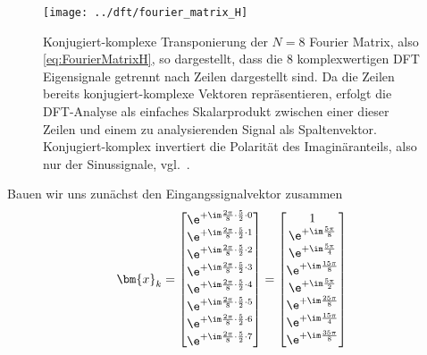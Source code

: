 \begin{figure}
\centering
\texttt{[image: ../dft/fourier\_matrix\_H]}
\caption{Konjugiert-komplexe Transponierung der $N=8$ Fourier Matrix,
also \eqref{eq:FourierMatrixH}, so dargestellt, dass
die 8 komplexwertigen DFT Eigensignale getrennt nach Zeilen dargestellt sind.
Da die Zeilen bereits konjugiert-komplexe Vektoren repräsentieren, erfolgt die
DFT-Analyse als einfaches Skalarprodukt zwischen einer dieser Zeilen und einem
zu analysierenden Signal als Spaltenvektor.
Konjugiert-komplex invertiert die Polarität des Imaginäranteils, also nur der Sinussignale,
vgl.~.
}
\label{fig:fourier_matrixH}
\end{figure}


\begin{ExCalc}
Bauen wir uns zunächst den Eingangssignalvektor zusammen
\begin{align}
\bm{x}_k =
\begin{bmatrix}
\e^{+\im \frac{2\pi}{8} \cdot \frac{5}{2} \cdot 0}\\
\e^{+\im \frac{2\pi}{8} \cdot \frac{5}{2} \cdot 1}\\
\e^{+\im \frac{2\pi}{8} \cdot \frac{5}{2} \cdot 2}\\
\e^{+\im \frac{2\pi}{8} \cdot \frac{5}{2} \cdot 3}\\
\e^{+\im \frac{2\pi}{8} \cdot \frac{5}{2} \cdot 4}\\
\e^{+\im \frac{2\pi}{8} \cdot \frac{5}{2} \cdot 5}\\
\e^{+\im \frac{2\pi}{8} \cdot \frac{5}{2} \cdot 6}\\
\e^{+\im \frac{2\pi}{8} \cdot \frac{5}{2} \cdot 7}
\end{bmatrix}
=
\begin{bmatrix}
1\\
\e^{+\im \frac{5\pi}{8}}\\
\e^{+\im \frac{5\pi}{4}}\\
\e^{+\im \frac{15\pi}{8}}\\
\e^{+\im \frac{5\pi}{2}}\\
\e^{+\im \frac{25\pi}{8}}\\
\e^{+\im \frac{15\pi}{4}}\\
\e^{+\im \frac{35\pi}{8}}
\end{bmatrix}
\end{align}



\end{ExCalc}
